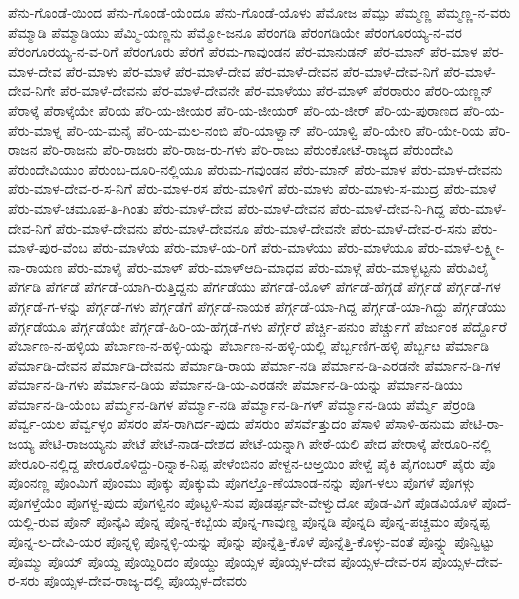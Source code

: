 ಪೆನು-ಗೊಂಡೆ-ಯಿಂದ
ಪೆನು-ಗೊಂಡೆ-ಯೆಂದೂ
ಪೆನು-ಗೊಂಡೆ-ಯೊಳು
ಪೆಮೋಜ
ಪೆಮ್ಪು
ಪೆಮ್ಮಣ್ಣ
ಪೆಮ್ಮಣ್ಣ-ನ-ವರು
ಪೆಮ್ಮಾಡಿ
ಪೆಮ್ಮಾಡಿಯು
ಪೆಮ್ಮಿ-ಯಣ್ಣನು
ಪೆಮ್ಮೋ-ಜನೂ
ಪೆರಂಗಡಿ
ಪೆರಂಗಡಿಯೇ
ಪೆರಂಗೂರಯ್ಯ-ನ-ವರ
ಪೆರಂಗೂರಯ್ಯ-ನ-ವ-ರಿಗೆ
ಪೆರಂಗೂರು
ಪೆರಗೆ
ಪೆರಮ-ಗಾವುಂಡನ
ಪೆರ-ಮಾನುಡನ್
ಪೆರ-ಮಾನ್
ಪೆರ-ಮಾಳ
ಪೆರ-ಮಾಳ-ದೇವ
ಪೆರ-ಮಾಳು
ಪೆರ-ಮಾಳೆ
ಪೆರ-ಮಾಳೆ-ದೇವ
ಪೆರ-ಮಾಳೆ-ದೇವನ
ಪೆರ-ಮಾಳೆ-ದೇವ-ನಿಗೆ
ಪೆರ-ಮಾಳೆ-ದೇವ-ನಿಗೇ
ಪೆರ-ಮಾಳೆ-ದೇವನು
ಪೆರ-ಮಾಳೆ-ದೇವನೇ
ಪೆರ-ಮಾಳೆಯು
ಪೆರ-ಮಾಳ್
ಪೆರರಾರುಂ
ಪೆರರಿ-ಯಣ್ಣನ್
ಪೆರಾಳ್ಕೆ
ಪೆರಾಳ್ಕೆಯೇ
ಪೆರಿಯ
ಪೆರಿ-ಯ-ಜೀಯರ
ಪೆರಿ-ಯ-ಜೀಯರ್
ಪೆರಿ-ಯ-ಜೀರ್
ಪೆರಿ-ಯ-ಪುರಾಣದ
ಪೆರಿ-ಯ-ಪೆರು-ಮಾಳ್ನ
ಪೆರಿ-ಯ-ಮನೈ
ಪೆರಿ-ಯ-ಮಲ-ನಂಬಿ
ಪೆರಿ-ಯಾಳ್ವಾನ್
ಪೆರಿ-ಯಾಳ್ವಿ
ಪೆರಿ-ಯೇರಿ
ಪೆರಿ-ಯೇ-ರಿಯ
ಪೆರಿ-ರಾಜನ
ಪೆರಿ-ರಾಜನು
ಪೆರಿ-ರಾಜರು
ಪೆರಿ-ರಾಜ-ರು-ಗಳು
ಪೆರಿ-ರಾಜು
ಪೆರುಂಕೋಟೆ-ರಾಜ್ಯದ
ಪೆರುಂದೇವಿ
ಪೆರುಂದೇವಿಯುಂ
ಪೆರುಂಬ-ದೂರಿ-ನಲ್ಲಿಯೂ
ಪೆರುಮ-ಗವುಂಡನ
ಪೆರು-ಮಾನ್
ಪೆರು-ಮಾಳ
ಪೆರು-ಮಾಳ-ದೇವನು
ಪೆರು-ಮಾಳ-ದೇವ-ರ-ಸ-ನಿಗೆ
ಪೆರು-ಮಾಳ-ರಸ
ಪೆರು-ಮಾಳಿಗೆ
ಪೆರು-ಮಾಳು
ಪೆರು-ಮಾಳು-ಸ-ಮುದ್ರ
ಪೆರು-ಮಾಳೆ
ಪೆರು-ಮಾಳೆ-ಚಮೂಪ-ತಿ-ಗಿಂತು
ಪೆರು-ಮಾಳೆ-ದೇವ
ಪೆರು-ಮಾಳೆ-ದೇವನ
ಪೆರು-ಮಾಳೆ-ದೇವ-ನಿ-ಗಿದ್ದ
ಪೆರು-ಮಾಳೆ-ದೇವ-ನಿಗೆ
ಪೆರು-ಮಾಳೆ-ದೇವನು
ಪೆರು-ಮಾಳೆ-ದೇವನೂ
ಪೆರು-ಮಾಳೆ-ದೇವನೇ
ಪೆರು-ಮಾಳೆ-ದೇವ-ರ-ಸನು
ಪೆರು-ಮಾಳೆ-ಪುರ-ವೆಂಬ
ಪೆರು-ಮಾಳೆಯ
ಪೆರು-ಮಾಳೆ-ಯ-ರಿಗೆ
ಪೆರು-ಮಾಳೆಯು
ಪೆರು-ಮಾಳೆಯೂ
ಪೆರು-ಮಾಳೆ-ಲಕ್ಷ್ಮೀ-ನಾ-ರಾಯಣ
ಪೆರು-ಮಾಳೈ
ಪೆರು-ಮಾಳ್
ಪೆರು-ಮಾಳ್ಆದಿ-ಮಾಧವ
ಪೆರು-ಮಾಳ್ಗೆ
ಪೆರು-ಮಾಳ್ಭಟ್ಟನು
ಪೆರುವಿಲೈ
ಪೆರ್ಗಡಿ
ಪೆರ್ಗಡೆ
ಪೆರ್ಗಡೆ-ಯಾಗಿ-ರುತ್ತಿದ್ದನು
ಪೆರ್ಗಡೆಯು
ಪೆರ್ಗಡೆ-ಯೊಳ್
ಪೆರ್ಗಡೆ-ಹೆಗ್ಗಡೆ
ಪೆರ್ಗ್ಗಡೆ
ಪೆರ್ಗ್ಗಡೆ-ಗಳ
ಪೆರ್ಗ್ಗಡೆ-ಗ-ಳನ್ನು
ಪೆರ್ಗ್ಗಡೆ-ಗಳು
ಪೆರ್ಗ್ಗಡೆಗೆ
ಪೆರ್ಗ್ಗಡೆ-ನಾಯಕ
ಪೆರ್ಗ್ಗಡೆ-ಯಾ-ಗಿದ್ದ
ಪೆರ್ಗ್ಗಡೆ-ಯಾ-ಗಿದ್ದು
ಪೆರ್ಗ್ಗಡೆಯು
ಪೆರ್ಗ್ಗಡೆಯೂ
ಪೆರ್ಗ್ಗಡೆಯೇ
ಪೆರ್ಗ್ಗಡೆ-ಹಿರಿ-ಯ-ಹೆಗ್ಗಡೆ-ಗಳು
ಪೆರ್ಗ್ಗೆರೆ
ಪೆರ್ಚ್ಚಿ-ಪನುಂ
ಪೆರ್ಚ್ಚುಗೆ
ಪೆರ್ಜುಂಕ
ಪೆರ್ದ್ದೊರೆ
ಪೆರ್ಬಾಣ-ನ-ಹಳ್ಳಿಯ
ಪೆರ್ಬಾಣ-ನ-ಹಳ್ಳಿ-ಯನ್ನು
ಪೆರ್ಬಾಣ-ನ-ಹಳ್ಳಿ-ಯಲ್ಲಿ
ಪೆರ್ಬ್ಬಣಿಗ-ಹಳ್ಳಿ
ಪೆರ್ಬ್ಬೞ
ಪೆರ್ಮಾಡಿ
ಪೆರ್ಮಾಡಿ-ದೇವನ
ಪೆರ್ಮಾಡಿ-ದೇವನು
ಪೆರ್ಮಾಡಿ-ರಾಯ
ಪೆರ್ಮಾ-ನಡಿ
ಪೆರ್ಮಾನ-ಡಿ-ಎರಡನೇ
ಪೆರ್ಮಾನ-ಡಿ-ಗಳ
ಪೆರ್ಮಾನ-ಡಿ-ಗಳು
ಪೆರ್ಮಾನ-ಡಿಯ
ಪೆರ್ಮಾನ-ಡಿ-ಯ-ಎರಡನೇ
ಪೆರ್ಮಾನ-ಡಿ-ಯನ್ನು
ಪೆರ್ಮಾನ-ಡಿಯು
ಪೆರ್ಮಾನ-ಡಿ-ಯೆಂಬ
ಪೆರ್ಮ್ಮನ-ಡಿಗಳ
ಪೆರ್ಮ್ಮಾ-ನಡಿ
ಪೆರ್ಮ್ಮಾನ-ಡಿ-ಗಳ್
ಪೆರ್ಮ್ಮಾನ-ಡಿಯ
ಪೆರ್ಮ್ಮೆ
ಪೆರ್ರಂಡಿ
ಪೆರ್ವ್ವ-ಯಲ
ಪೆರ್ವ್ವಳ್ಳಂ
ಪೆಸರಂ
ಪೆಸ-ರಾಗಿರ್ದ-ಪುದು
ಪೆಸರುಂ
ಪೆಸರ್ವೆತ್ತುದಂ
ಪೆಸಾಳಿ
ಪೆಸಾಳಿ-ಹನುಮ
ಪೇಟಿ-ರಾ-ಜಯ್ಯ
ಪೇಟಿ-ರಾಜಯ್ಯನು
ಪೇಟೆ
ಪೇಟೆ-ನಾಡ-ದೇಶದ
ಪೇಟೆ-ಯನ್ನಾಗಿ
ಪೇಠೆ-ಯಲಿ
ಪೇದ
ಪೇರಾಳ್ಕೆ
ಪೇರೂರಿ-ನಲ್ಲಿ
ಪೇರೂರಿ-ನಲ್ಲಿದ್ದ
ಪೇರೂರೊಳಿದ್ದು-ರಿನ್ನಾಕ-ನಿಪ್ಪ
ಪೇಳೆಂಬಿನಂ
ಪೇಳ್ದನ-ೞಅ್ತಯಿಂ
ಪೇಳ್ವೆ
ಪೈಕಿ
ಪೈಗಂಬರ್
ಪೈರು
ಪೊ
ಪೊಂನಣ್ಣ
ಪೊಂಮಿಗೆ
ಪೊಂಮು
ಪೊಕ್ಕು
ಪೊಕ್ಕುಮೆ
ಪೊಗಲ್ತೊ-ಣೆಯಾಂಡ-ನನ್ನು
ಪೊಗ-ಳಲು
ಪೊಗಳೆ
ಪೊಗಳ್ಗು
ಪೊಗಳ್ತೆಯೆಂ
ಪೊಗಳ್ದ-ಪುದು
ಪೊಗಳ್ವಿನಂ
ಪೊಟ್ಟಳಿ-ಸುವ
ಪೊಡರ್ಪ್ಪವೇ-ವೇಳ್ವುದೋ
ಪೊಡ-ವಿಗೆ
ಪೊಡವಿಯೊಳೆ
ಪೊದೆ-ಯಲ್ಲಿ-ರುವ
ಪೊನ್
ಪೊನ್ಕೆವಿ
ಪೊನ್ನ
ಪೊನ್ನ-ಕಬ್ಬೆಯ
ಪೊನ್ನ-ಗಾವುಣ್ಡ
ಪೊನ್ನಡಿ
ಪೊನ್ನದಿ
ಪೊನ್ನ-ಪಚ್ಚಮಂ
ಪೊನ್ನಪ್ಪ
ಪೊನ್ನ-ಲ-ದೇವಿ-ಯರ
ಪೊನ್ನಳ್ಳಿ
ಪೊನ್ನಳ್ಳಿ-ಯನ್ನು
ಪೊನ್ನು
ಪೊನ್ನೆತ್ತಿ-ಕೊಳೆ
ಪೊನ್ನೆತ್ತಿ-ಕೊಳ್ಳು-ವಂತೆ
ಪೊನ್ನ್ನು
ಪೊನ್ವಿಟ್ಟು
ಪೊಮ್ಮು
ಪೊಯ್
ಪೊಯ್ದ
ಪೊಯ್ದಿರಿದಂ
ಪೊಯ್ದು
ಪೊಯ್ಸಳ
ಪೊಯ್ಸಳ-ದೇವ
ಪೊಯ್ಸಳ-ದೇವ-ರಸ
ಪೊಯ್ಸಳ-ದೇವ-ರ-ಸರು
ಪೊಯ್ಸಳ-ದೇವ-ರಾಜ್ಯ-ದಲ್ಲಿ
ಪೊಯ್ಸಳ-ದೇವರು
